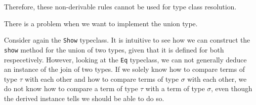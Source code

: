 Therefore, these non-derivable rules cannot be used for type class resolution.









There is a problem when we want to implement the union type.

Consider again the \texttt{Show} typeclass. It is intuitive to see how we can construct the \texttt{show} method for the union of two types, given that it is defined for both respecetively.
However, looking at the \texttt{Eq} typeclass, we can not generally deduce an instance of the join of two types.
If we solely know how to compare terms of type $\tau$ with each other and how to compare terms of type $\sigma$ with each other,
we do not know how to compare a term of type $\tau$ with a term of type $\sigma$, even though the derived instance tells we should be able to do so.

